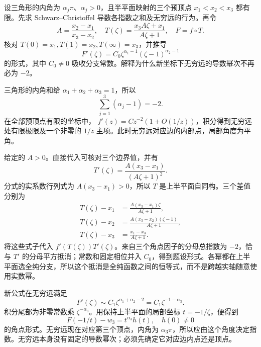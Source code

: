 \begin{exercise}\label{b3:ex:07-4}
设三角形的内角为 \(\alpha_j\pi\)、\(\alpha_j>0\)，且半平面映射的三个预顶点 \(x_1<x_2<x_3\) 都有限。先求 Schwarz--Christoffel 导数各指数之和及无穷远的行为。再令
\[
 A=\frac{x_2-x_1}{x_3-x_2},\quad
 T(\zeta)=\frac{x_3A\zeta+x_1}{A\zeta+1},\quad F=f\circ T.
\]
核对 \(T(0)=x_1,T(1)=x_2,T(\infty)=x_3\)，并推导
\[
 F'(\zeta)=C_0\zeta^{\alpha_1-1}(\zeta-1)^{\alpha_2-1}
\]
的形式，其中 \(C_0\ne0\) 吸收分支常数。解释为什么新坐标下无穷远的导数幂次不再必为 \(-2\)。
\end{exercise}
\begin{solution}
三角形的内角和给 \(\alpha_1+\alpha_2+\alpha_3=1\)，所以
\[
 \sum_{j=1}^3(\alpha_j-1)=-2.
\]
在全部预顶点有限的坐标中，
\(f'(z)=Cz^{-2}(1+O(1/z))\)，积分得到无穷远处有限极限及一个非零的 \(1/z\) 主项。此时无穷远对应边的内部点，局部角度为平角。

给定的 \(A>0\)。直接代入可核对三个边界值，并有
\[
 T'(\zeta)=\frac{A(x_3-x_1)}{(A\zeta+1)^2}.
\]
分式的实系数行列式为 \(A(x_3-x_1)>0\)，所以 \(T\) 是上半平面自同构。三个差值分别为
\[
 \begin{aligned}
 T(\zeta)-x_1&=\frac{A(x_3-x_1)\zeta}{A\zeta+1},\\
 T(\zeta)-x_2&=\frac{A(x_3-x_2)(\zeta-1)}{A\zeta+1},\\
 T(\zeta)-x_3&=\frac{x_1-x_3}{A\zeta+1}.
 \end{aligned}
\]
将这些式子代入 \(f'(T(\zeta))T'(\zeta)\)。来自三个角点因子的分母总指数为 \(-2\)，恰与 \(T'\) 的分母平方抵消；常数和固定相位并入 \(C_0\)，得到题设形式。各幂都在上半平面选全纯分支，所以这个抵消是全纯函数之间的恒等式，而不是跨越实轴随意使用实数幂。

新公式在无穷远满足
\[
 F'(\zeta)\sim C_1\zeta^{\alpha_1+\alpha_2-2}
 =C_1\zeta^{-1-\alpha_3}.
\]
积分尾部为非零常数乘 \(\zeta^{-\alpha_3}\)。用保持上半平面的局部坐标 \(t=-1/\zeta\)，便得到
\[
 F(-1/t)-w_3=t^{\alpha_3}h(t),\quad h(0)\ne0
\]
的角点形式。无穷远现在对应第三个顶点，内角为 \(\alpha_3\pi\)，所以应由这个角度决定指数。无穷远本身没有固定的导数幂次；必须先确定它对应边内点还是顶点。
\end{solution}

